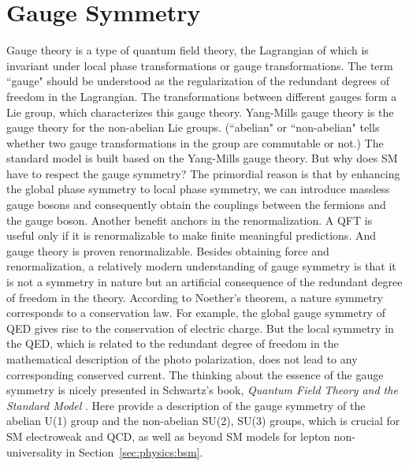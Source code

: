 








\section{Gauge Symmetry}
\label{sec:physics:qft:gaugeSymmetry}

Gauge theory is a type of quantum field theory, the Lagrangian of which is invariant under local phase transformations or gauge transformations. The term ``gauge" should be understood as the regularization of the redundant degrees of freedom in the Lagrangian. The transformations between different gauges form a Lie group, which characterizes this gauge theory. Yang-Mills gauge theory is the gauge theory for the non-abelian Lie groups. (``abelian" or ``non-abelian" tells whether two gauge transformations in the group are commutable or not.) The standard model is built based on the Yang-Mills gauge theory. But why does SM have to respect the gauge symmetry? The primordial reason is that by enhancing the global phase symmetry to local phase symmetry, we can introduce massless gauge bosons and consequently obtain the couplings between the fermions and the gauge boson. Another benefit anchors in the renormalization. A QFT is useful only if it is renormalizable to make finite meaningful predictions. And gauge theory is proven renormalizable. Besides obtaining force and renormalization, a relatively modern understanding of gauge symmetry is that it is not a symmetry in nature but an artificial consequence of the redundant degree of freedom in the theory. According to Noether's theorem, a nature symmetry corresponds to a conservation law. For example, the global gauge symmetry of QED gives rise to the conservation of electric charge. But the local symmetry in the QED, which is related to the redundant degree of freedom in the mathematical description of the photo polarization, does not lead to any corresponding conserved current. The thinking about the essence of the gauge symmetry is nicely presented in Schwartz's book, \textit{Quantum Field Theory and the Standard Model} \cite{schwartz2014quantum}. Here provide a description of the gauge symmetry of the abelian U(1) group and the non-abelian SU(2), SU(3) groups, which is crucial for SM electroweak and QCD, as well as beyond SM models for lepton non-universality in Section~\ref{sec:physics:bsm}.



